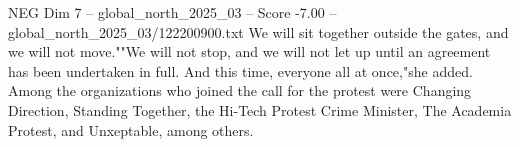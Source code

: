 \begin{textsample}{NEG Dim 7 – global\_north\_2025\_03 – Score -7.00 – global\_north\_2025\_03/122200900.txt}
We will sit together outside the gates, and we will not move.""We will not stop, and we will not let up until an agreement has been undertaken in full.
And this time, everyone all at once,"she added.
Among the organizations who joined the call for the protest were Changing Direction, Standing Together, the Hi-Tech Protest Crime Minister, The Academia Protest, and Unxeptable, among others.

\end{textsample}
